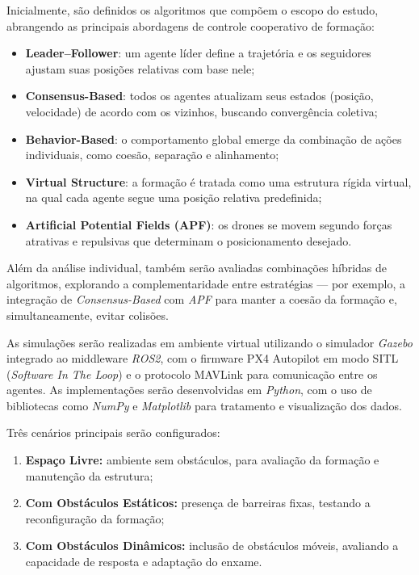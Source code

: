 \documentclass[portuguese]{sbcreviews-2025}%
\begin{document}
Inicialmente, são definidos os algoritmos que compõem o escopo do estudo, abrangendo as principais abordagens de controle cooperativo de formação:

\begin{itemize}
    \item \textbf{Leader–Follower}: um agente líder define a trajetória e os seguidores ajustam suas posições relativas com base nele;
    \item \textbf{Consensus-Based}: todos os agentes atualizam seus estados (posição, velocidade) de acordo com os vizinhos, buscando convergência coletiva;
    \item \textbf{Behavior-Based}: o comportamento global emerge da combinação de ações individuais, como coesão, separação e alinhamento;
    \item \textbf{Virtual Structure}: a formação é tratada como uma estrutura rígida virtual, na qual cada agente segue uma posição relativa predefinida;
    \item \textbf{Artificial Potential Fields (APF)}: os drones se movem segundo forças atrativas e repulsivas que determinam o posicionamento desejado.
\end{itemize}

Além da análise individual, também serão avaliadas combinações híbridas de algoritmos, explorando a complementaridade entre estratégias — por exemplo, a integração de \textit{Consensus-Based} com \textit{APF} para manter a coesão da formação e, simultaneamente, evitar colisões.

As simulações serão realizadas em ambiente virtual utilizando o simulador \textit{Gazebo} integrado ao middleware \textit{ROS2}, com o firmware PX4 Autopilot em modo SITL (\textit{Software In The Loop}) e o protocolo MAVLink para comunicação entre os agentes. As implementações serão desenvolvidas em \textit{Python}, com o uso de bibliotecas como \textit{NumPy} e \textit{Matplotlib} para tratamento e visualização dos dados.

Três cenários principais serão configurados:
\begin{enumerate}
    \item \textbf{Espaço Livre:} ambiente sem obstáculos, para avaliação da formação e manutenção da estrutura;
    \item \textbf{Com Obstáculos Estáticos:} presença de barreiras fixas, testando a reconfiguração da formação;
    \item \textbf{Com Obstáculos Dinâmicos:} inclusão de obstáculos móveis, avaliando a capacidade de resposta e adaptação do enxame.
\end{enumerate}
\end{document}
